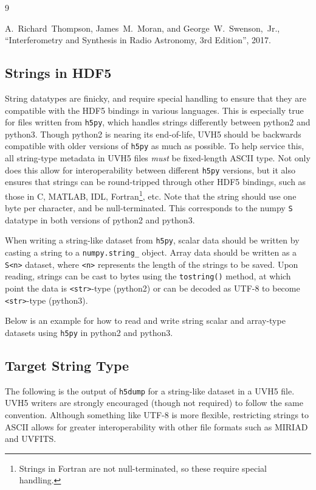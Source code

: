\documentclass[11pt, oneside]{article}
\begin{document}
\begin{thebibliography}{9}

 A.~Richard~Thompson, James~M.~Moran, and George~W.~Swenson,~Jr.,
  ``Interferometry and Synthesis in Radio Astronomy, 3rd Edition'', 2017.

\end{thebibliography}

\newpage

\begin{appendices}
\section{Strings in HDF5}
\label{appendix:strings}
String datatypes are finicky, and require special handling to ensure that they
are compatible with the HDF5 bindings in various languages. This is especially
true for files written from \verb+h5py+, which handles strings differently
between python2 and python3. Though python2 is nearing its end-of-life, UVH5
should be backwards compatible with older versions of \verb+h5py+ as much as
possible. To help service this, all string-type metadata in UVH5 files
\textit{must} be fixed-length ASCII type. Not only does this allow for
interoperability between different \verb+h5py+ versions, but it also ensures
that strings can be round-tripped through other HDF5 bindings, such as those in
C, MATLAB, IDL, Fortran\footnote{Strings in Fortran are not null-terminated, so
  these require special handling.}, etc. Note that the string should use one
byte per character, and be null-terminated. This corresponds to the numpy
\verb+S+ datatype in both versions of python2 and python3.

When writing a string-like dataset from \verb+h5py+, scalar data should be
written by casting a string to a \verb+numpy.string_+ object. Array data should
be written as a \verb+S<n>+ dataset, where \verb+<n>+ represents the length of
the strings to be saved. Upon reading, strings can be cast to bytes using the
\verb+tostring()+ method, at which point the data is \verb+<str>+-type (python2)
or can be decoded as UTF-8 to become \verb+<str>+-type (python3).

Below is an example for how to read and write string scalar and array-type
datasets using \verb+h5py+ in python2 and python3.

\subsection{Target String Type}
The following is the output of \texttt{h5dump} for a string-like dataset in a
UVH5 file. UVH5 writers are strongly encouraged (though not required) to follow
the same convention. Although something like UTF-8 is more flexible, restricting
strings to ASCII allows for greater interoperability with other file formats
such as MIRIAD and UVFITS.


\end{appendices}
\end{document}
